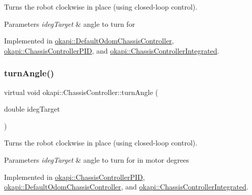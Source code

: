 Turns the robot clockwise in place (using closed-\/loop control).


\begin{DoxyParams}{Parameters}
{\em ideg\+Target} & angle to turn for \\
\hline
\end{DoxyParams}


Implemented in \mbox{\hyperlink{classokapi_1_1DefaultOdomChassisController_a4ba07ac4bea9ff2d8aea30be72f6a0ea}{okapi\+::\+Default\+Odom\+Chassis\+Controller}}, \mbox{\hyperlink{classokapi_1_1ChassisControllerPID_a56aae5a15daa9ed81963dd48fce69535}{okapi\+::\+Chassis\+Controller\+P\+ID}}, and \mbox{\hyperlink{classokapi_1_1ChassisControllerIntegrated_a3c2ae782167fd9c6b27d637563e3a066}{okapi\+::\+Chassis\+Controller\+Integrated}}.

\mbox{\label{classokapi_1_1ChassisController_a6aca227e35ececd02eed1cc42d09ad1d}} 
\subsubsection{\texorpdfstring{turnAngle()}{turnAngle()}\hspace{0.1cm}{\footnotesize\ttfamily [2/2]}}
{\footnotesize\ttfamily virtual void okapi\+::\+Chassis\+Controller\+::turn\+Angle (\begin{DoxyParamCaption}\item[{double}]{ideg\+Target }\end{DoxyParamCaption})\hspace{0.3cm}{\ttfamily [pure virtual]}}

Turns the robot clockwise in place (using closed-\/loop control).


\begin{DoxyParams}{Parameters}
{\em ideg\+Target} & angle to turn for in motor degrees \\
\hline
\end{DoxyParams}


Implemented in \mbox{\hyperlink{classokapi_1_1ChassisControllerPID_a140679da584fdc8bd057678e277742e7}{okapi\+::\+Chassis\+Controller\+P\+ID}}, \mbox{\hyperlink{classokapi_1_1DefaultOdomChassisController_a05a8a6684b3afe4f7c2ecbc24699f70d}{okapi\+::\+Default\+Odom\+Chassis\+Controller}}, and \mbox{\hyperlink{classokapi_1_1ChassisControllerIntegrated_a3f13749508bf420468ffdb54f62a9da2}{okapi\+::\+Chassis\+Controller\+Integrated}}.

